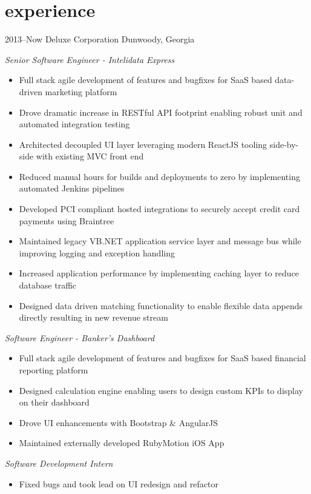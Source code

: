 \documentclass[]{friggeri-cv} %
\begin{document}
\section{experience}
\begin{entrylist}


\entry
{2013--Now}
{Deluxe Corporation}
{Dunwoody, Georgia}
{\raggedright
  \emph{Senior Software Engineer - Intelidata Express}
  \begin{itemize}
    \item Full stack agile development of features and bugfixes for SaaS based data-driven marketing platform 
    \item Drove dramatic increase in RESTful API footprint enabling robust unit and automated integration testing
    \item Architected decoupled UI layer leveraging modern ReactJS tooling side-by-side with existing MVC front end
    \item Reduced manual hours for builds and deployments to zero by implementing automated Jenkins pipelines
    \item Developed PCI compliant hosted integrations to securely accept credit card payments using Braintree
    \item Maintained legacy VB.NET application service layer and message bus while improving logging and exception handling
    \item Increased application performance by implementing caching layer to reduce database traffic
    \item Designed data driven matching functionality to enable flexible data appends directly resulting in new revenue stream
  \end{itemize}
  \emph{Software Engineer - Banker's Dashboard}
  \begin{itemize}
    \item Full stack agile development of features and bugfixes for SaaS based financial reporting platform
    \item Designed calculation engine enabling users to design custom KPIs to display on their dashboard
    \item Drove UI enhancements with Bootstrap \& AngularJS
    \item Maintained externally developed RubyMotion iOS App
  \end{itemize}
  \emph{Software Development Intern}
  \begin{itemize}
    \item Fixed bugs and took lead on UI redesign and refactor

\end{itemize}}
\end{entrylist}
\end{document}
